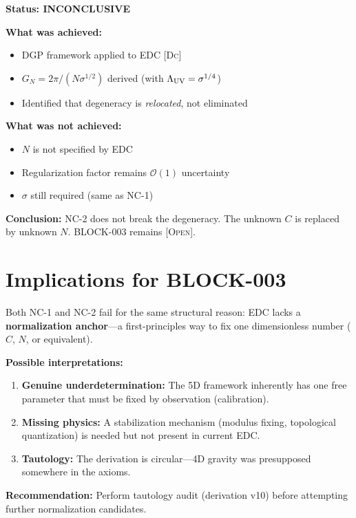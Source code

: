 \documentclass[11pt,a4paper]{article}
\theoremstyle{definition}
\newcommand{\Deriv}{\textsc{[Dc]}}
\newcommand{\Open}{\textsc{[Open]}}
\begin{document}
\begin{outcomebox}
\textbf{Status: INCONCLUSIVE}

\textbf{What was achieved:}
\begin{itemize}
\item DGP framework applied to EDC \Deriv
\item $G_N = 2\pi / (N \sigma^{1/2})$ derived (with $\Lambda_{\rm UV} = \sigma^{1/4}$)
\item Identified that degeneracy is \textit{relocated}, not eliminated
\end{itemize}

\textbf{What was not achieved:}
\begin{itemize}
\item $N$ is not specified by EDC
\item Regularization factor remains $\mathcal{O}(1)$ uncertainty
\item $\sigma$ still required (same as NC-1)
\end{itemize}

\textbf{Conclusion:}
NC-2 does not break the degeneracy. The unknown $C$ is replaced by unknown
$N$. BLOCK-003 remains \Open.
\end{outcomebox}

\section{Implications for BLOCK-003}

\begin{statusbox}[Diagnosis]
Both NC-1 and NC-2 fail for the same structural reason: EDC lacks a
\textbf{normalization anchor}---a first-principles way to fix one
dimensionless number ($C$, $N$, or equivalent).

\textbf{Possible interpretations:}
\begin{enumerate}
\item \textbf{Genuine underdetermination:} The 5D framework inherently
has one free parameter that must be fixed by observation (calibration).
\item \textbf{Missing physics:} A stabilization mechanism (modulus fixing,
topological quantization) is needed but not present in current EDC.
\item \textbf{Tautology:} The derivation is circular---4D gravity was
presupposed somewhere in the axioms.
\end{enumerate}

\textbf{Recommendation:} Perform tautology audit (derivation v10) before
attempting further normalization candidates.
\end{statusbox}
\end{document}
